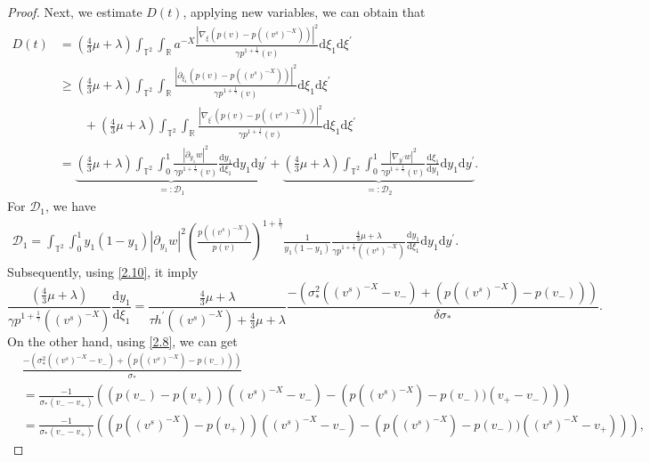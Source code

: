 \documentclass[10pt,reqno]{amsart}
\numberwithin{equation}{section}
\newcommand{\dif}{\mathrm{d}}
\begin{document}
\begin{proof}
Next, we estimate $D(t)$, applying new variables, we can obtain that
\begin{align*}
D(t)&=(\frac{4}{3}\mu+\lambda)\int_{\mathbb{T}^2}\int_{\mathbb{R}}
a^{-X}\frac{|\nabla_\xi(p(v)-p((v^s)^{-X}))|^2}{\gamma p^{1+\frac{1}{\gamma}}(v)}\dif \xi_1\dif \xi^{\prime}\\
&\ge(\frac{4}{3}\mu+\lambda)\int_{\mathbb{T}^2}\int_{\mathbb{R}}
\frac{|\partial_{\xi_1}(p(v)-p((v^s)^{-X}))|^2}{\gamma p^{1+\frac{1}{\gamma}}(v)}\dif \xi_1\dif \xi^{\prime}\\
&\qquad+(\frac{4}{3}\mu+\lambda)\int_{\mathbb{T}^2}\int_{\mathbb{R}}
\frac{|\nabla_{\xi^\prime}(p(v)-p((v^s)^{-X}))|^2}{\gamma p^{1+\frac{1}{\gamma}}(v)}\dif \xi_1\dif \xi^{\prime}\\
&=\underbrace{(\frac{4}{3}\mu+\lambda)\int_{\mathbb{T}^2}\int_0^1
\frac{|\partial_{y_1}w|^2}{\gamma p^{1+\frac{1}{\gamma}}(v)}\frac{\dif y_1}{\dif \xi_1}\dif y_1\dif y^{\prime}}\limits_{=:\mathcal{D}_1}
+\underbrace{(\frac{4}{3}\mu+\lambda)\int_{\mathbb{T}^2}\int_0^1
\frac{|\nabla_{y^\prime}w|^2}{\gamma p^{1+\frac{1}{\gamma}}(v)}\frac{\dif \xi_1}{\dif y_1}\dif y_1\dif y^{\prime}}\limits_{=:\mathcal{D}_2}.
\end{align*}
For $\mathcal{D}_1$, we have
\begin{align*}
	\mathcal{D}_1=\int_{\mathbb{T}^2}\int_0^1y_1(1-y_1)|\partial_{y_1}w|^2
	\left(\frac{p((v^s)^{-X})}{p(v)}\right)^{1+\frac{1}{\gamma}}
	\frac{1}{ y_1(1-y_1)}
	\frac{\frac{4}{3}\mu+\lambda}{\gamma p^{1+\frac{1}{\gamma}}((v^s)^{-X})
	}\frac{\dif y_1}{\dif \xi_1}
	\dif y_1\dif y^{\prime}.
\end{align*}
Subsequently, using \eqref{2.10}, it imply
\[
\frac{(\frac{4}{3}\mu+\lambda)}{\gamma p^{1+\frac{1}{\gamma}}((v^s)^{-X})}\frac{\dif y_1}{\dif \xi_1}=\frac{\frac{4}{3}\mu+\lambda}{\tau h^\prime((v^s)^{-X})+\frac{4}{3}\mu+\lambda}
\frac{-\left(\sigma_\ast^2((v^s)^{-X}-v_-)+\left(p((v^s)^{-X})-p(v_-)\right)\right)}{\delta\sigma_\ast}.
\]
On the other hand, using \eqref{2.8}, we can get
\begin{align*}
&\frac{-\left(\sigma_\ast^2((v^s)^{-X}-v_-)+\left(p((v^s)^{-X})-p(v_-)\right)\right)}{\sigma_\ast}\\
&=\frac{-1}{\sigma_\ast(v_--v_+)}\left((p(v_-)-p(v_+))((v^s)^{-X}-v_-)
-\left(p((v^s)^{-X})-p(v_-))(v_+-v_-)\right)\right)\\
&=\frac{-1}{\sigma_\ast(v_--v_+)}\left((p((v^s)^{-X})-p(v_+))((v^s)^{-X}-v_-)
-\left(p((v^s)^{-X})-p(v_-))((v^s)^{-X}-v_+)\right)\right),
\end{align*}

\end{proof}
\end{document}
